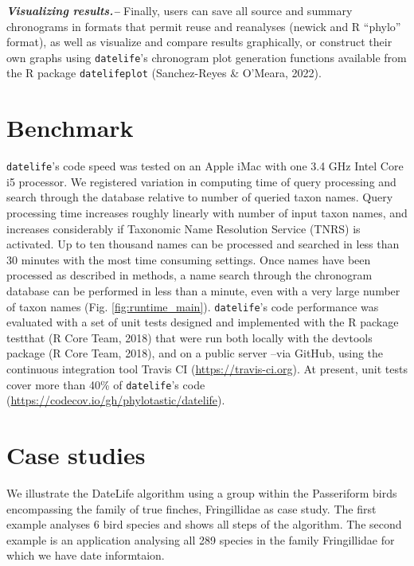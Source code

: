 \documentclass[
  english,
  man]{apa6}
\begin{document}
\emph{\textbf{Visualizing results.--}}
Finally, users can save all source and summary chronograms in formats that permit reuse and reanalyses (newick and R ``phylo'' format), as well as visualize and compare results graphically, or construct their own graphs using \texttt{datelife}'s chronogram plot generation functions available from the R package \texttt{datelifeplot} (Sanchez-Reyes \& O'Meara, 2022).

\hypertarget{benchmark}{%
\section{Benchmark}\label{benchmark}}

\texttt{datelife}'s code speed was tested on an Apple iMac
with one 3.4 GHz Intel Core i5 processor.
We registered variation in computing time of query processing and search through the database relative to number of queried taxon names.
Query processing time increases roughly linearly with number of input taxon names, and
increases considerably if Taxonomic Name Resolution Service (TNRS) is activated.
Up to ten thousand names can be processed and searched in less than 30 minutes with the most time consuming settings.
Once names have been processed as described in methods, a name search through the chronogram database can be performed in less than a minute, even with a very large number of taxon names (Fig. \ref{fig:runtime_main}).
\texttt{datelife}'s code performance was evaluated with a set of unit tests designed and
implemented with the R package testthat (R Core Team, 2018) that were run both locally
with the devtools package (R Core Team, 2018), and on a public server --via
GitHub, using the continuous integration tool Travis CI (\url{https://travis-ci.org}). At
present, unit tests cover more than 40\% of \texttt{datelife}'s code (\url{https://codecov.io/gh/phylotastic/datelife}).

\hypertarget{case-studies}{%
\section{Case studies}\label{case-studies}}

We illustrate the DateLife algorithm using a group within the Passeriform birds encompassing the family of true finches, Fringillidae as case study. The first example analyses 6 bird species and shows all steps of the algorithm. The second example is an application analysing all 289 species in the family Fringillidae for which we have date informtaion.
\end{document}
